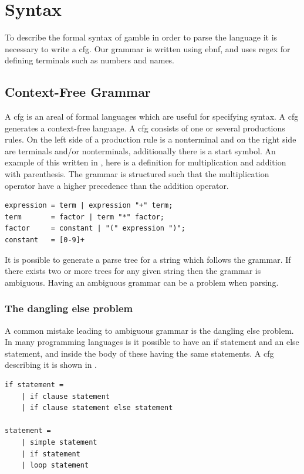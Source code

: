 \chapter{Syntax}\label{chap:syntax}

To describe the formal syntax of \gls{gamble} in order to parse the language it is necessary to write a \acrfull{cfg}.
Our grammar is written using \acrfull{ebnf}, and uses \acrfull{regex} for defining terminals such as numbers and names.

\section{Context-Free Grammar}
A \acrshort{cfg} is an areal of formal languages which are useful for specifying syntax. 
A \acrshort{cfg} generates a context-free language. 
A \acrshort{cfg} consists of one or several productions rules.
On the left side of a production rule is a nonterminal and on the right side are terminals and/or nonterminals, additionally there is a start symbol. %
An example of this written in , here is a definition for multiplication and addition with parenthesis.
The grammar is structured such that the multiplication operator have a higher precedence than the addition operator.

\begin{lstlisting}[caption={An example of a \acrshort{cfg} written in \acrshort{ebnf}, with \acrshort{regex} for defining numbers. },frame=tlrb,label={lst:cfglst1},numbers=none]
expression = term | expression "+" term;
term       = factor | term "*" factor;
factor     = constant | "(" expression ")";
constant   = [0-9]+
\end{lstlisting}

It is possible to generate a parse tree for a string which follows the grammar. 
If there exists two or more trees for any given string then the grammar is ambiguous. 
Having an ambiguous grammar can be a problem when parsing.   

\subsection{The dangling else problem}

A common mistake leading to ambiguous grammar is the dangling else problem. \citep{danglingelse}
In many programming languages is it possible to have an if statement and an else statement, and inside the body of these having the same statements. 
A \acrshort{cfg} describing it is shown in .
\begin{lstlisting}[caption={An example of a \acrshort{cfg} describing an if statement. \citep{danglingelse}},frame=tlrb,label={lst:danglingelseex1},numbers=none]
if statement =
    | if clause statement
    | if clause statement else statement

statement =
    | simple statement
    | if statement
    | loop statement
\end{lstlisting}

